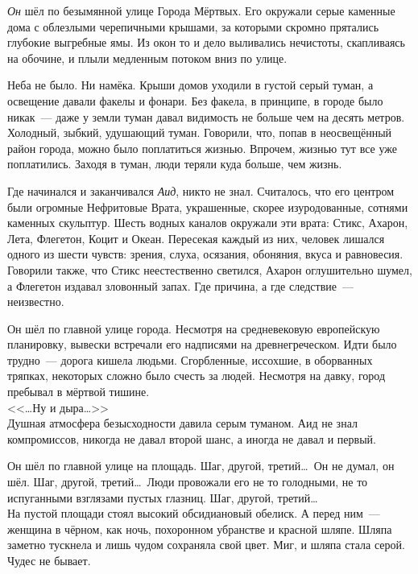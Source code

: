 \documentclass[openany, oneside]{book}
\begin{document}
\textit{Он} шёл по безымянной улице Города Мёртвых. Его окружали серые каменные дома с облезлыми черепичными крышами, за которыми скромно прятались глубокие выгребные ямы. Из окон то и дело выливались нечистоты, скапливаясь на обочине, и плыли медленным потоком вниз по улице.

Неба не было. Ни намёка. Крыши домов уходили в густой серый туман, а освещение давали факелы и фонари. Без факела, в принципе, в городе было никак~--- даже у земли туман давал видимость не больше чем на десять метров. Холодный, зыбкий, удушающий туман. Говорили, что, попав в неосвещённый район города, можно было поплатиться жизнью. Впрочем, жизнью тут все уже поплатились. Заходя в туман, люди теряли куда больше, чем жизнь.

Где начинался и заканчивался \textit{Аид}, никто не знал. Считалось, что его центром были огромные Нефритовые Врата, украшенные, скорее изуродованные, сотнями каменных скульптур. Шесть водных каналов окружали эти врата: Стикс, Ахарон, Лета, Флегетон, Коцит и Океан. Пересекая каждый из них, человек лишался одного из шести чувств: зрения, слуха, осязания, обоняния, вкуса и равновесия. Говорили также, что Стикс неестественно светился, Ахарон оглушительно шумел, а Флегетон издавал зловонный запах. Где причина, а где следствие~--- неизвестно.

Он шёл по главной улице города. Несмотря на средневековую европейскую планировку, вывески встречали его надписями на древнегреческом. Идти было трудно~--- дорога кишела людьми. Сгорбленные, иссохшие, в оборванных тряпках, некоторых сложно было счесть за людей. Несмотря на давку, город пребывал в мёртвой тишине.\\

<<\dots Ну и дыра\dots>>\\

Душная атмосфера безысходности давила серым туманом. Аид не знал компромиссов, никогда не давал второй шанс, а иногда не давал и первый.

Он шёл по главной улице на площадь. Шаг, другой, третий\dots \ Он не думал, он шёл. Шаг, другой, третий\dots \ Люди провожали его не то голодными, не то испуганными взглязами пустых глазниц. Шаг, другой, третий\dots\\

На пустой площади стоял высокий обсидиановый обелиск. А перед ним~--- женщина в чёрном, как ночь, похоронном убранстве и красной шляпе. Шляпа заметно тускнела и лишь чудом сохраняла свой цвет. Миг, и шляпа стала серой. Чудес не бывает.
\end{document}

